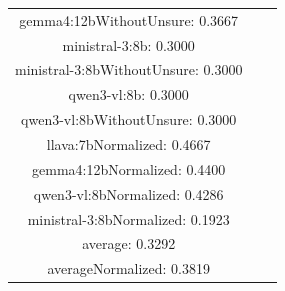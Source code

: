 \documentclass[a4paper]{article}
\begin{document}
\begin{tabular}{ccc}
gemma4:12bWithoutUnsure: 0.3667 \\ ministral-3:8b: 0.3000 \\ ministral-3:8bWithoutUnsure: 0.3000 \\ qwen3-vl:8b: 0.3000 \\ qwen3-vl:8bWithoutUnsure: 0.3000 \\ llava:7bNormalized: 0.4667 \\ gemma4:12bNormalized: 0.4400 \\ qwen3-vl:8bNormalized: 0.4286 \\ ministral-3:8bNormalized: 0.1923 \\ average: 0.3292 \\ averageNormalized: 0.3819 \end{minipage}\\
\end{tabular}

\vspace{5mm}
\end{document}
